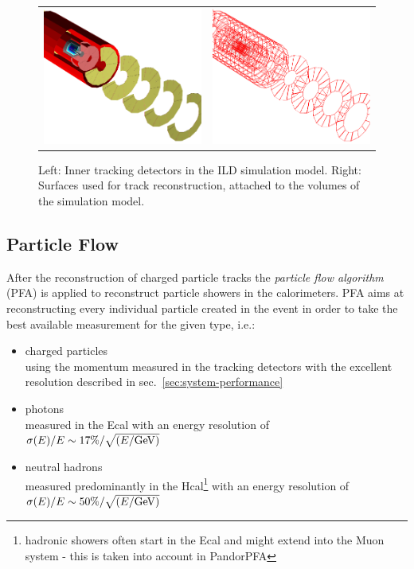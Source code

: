 \begin{figure}[b!]
\begin{tabular}{cc}
\includegraphics[width=0.5\hsize]{Modelling/fig/ild_inner_trackers.png} &
\includegraphics[width=0.5\hsize]{Modelling/fig/ild_inner_trackers_surfaces.png}
\end{tabular}
\caption{\label{fig:inner_trk_surfaces} Left: Inner tracking detectors in the ILD simulation model.
  Right: Surfaces used for track reconstruction, attached to the volumes of the simulation model.}
\end{figure}

\subsection{Particle Flow}

After the reconstruction of charged particle tracks the  \emph{particle flow algorithm} (PFA) is applied
to reconstruct particle showers in the calorimeters.  PFA aims at reconstructing every individual particle
created in the event in order to take the best available measurement for the given type, i.e.:
\begin{itemize}
\item charged particles\\
  using the momentum measured in the tracking detectors with the excellent resolution described in sec.~\ref{sec:system-performance}
\item photons\\
  measured in the Ecal with an energy resolution of $\sigma(E)/E \sim  17\% / \sqrt{(E/\rm{GeV})}$
\item neutral hadrons\\
  measured predominantly in the Hcal\footnote{hadronic showers often start in the Ecal and might extend into the Muon system -
    this is taken into account in PandorPFA} with an energy resolution of $\sigma(E)/E \sim  50\% / \sqrt{(E/\rm{GeV})}$ %
\end{itemize}

